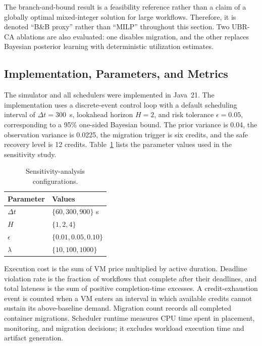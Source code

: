 The branch-and-bound result is a feasibility reference rather than a
claim of a globally optimal mixed-integer solution for large
workflows. Therefore, it is denoted ``B\&B proxy'' rather than
``MILP'' throughout this section. Two UBR-CA ablations are also
evaluated: one disables migration, and the other replaces Bayesian
posterior learning with deterministic utilization estimates.

\subsection{Implementation, Parameters, and Metrics}
\label{subsec:implementation}

The simulator and all schedulers were implemented in Java~21. The
implementation uses a discrete-event control loop with a default
scheduling interval of $\Delta t=300$~s, lookahead horizon $H=2$, and
risk tolerance $\epsilon=0.05$, corresponding to a 95\% one-sided
Bayesian bound. The prior variance is 0.04, the observation variance is
0.0225, the migration trigger is six credits, and the safe recovery
level is 12 credits. Table~\ref{tab:sensitivity-config} lists the
parameter values used in the sensitivity study.

\begin{table}[t]
\centering
\caption{Sensitivity-analysis configurations.}
\label{tab:sensitivity-config}
\begin{tabular}{ll}
\toprule
Parameter & Values \\
\midrule
$\Delta t$ & $\{60,300,900\}$ s \\
$H$ & $\{1,2,4\}$ \\
$\epsilon$ & $\{0.01,0.05,0.10\}$ \\
$\lambda$ & $\{10,100,1000\}$ \\
\bottomrule
\end{tabular}
\end{table}

Execution cost is the sum of VM price multiplied by active duration.
Deadline violation rate is the fraction of workflows that complete
after their deadlines, and total lateness is the sum of positive
completion-time excesses. A credit-exhaustion event is counted when a
VM enters an interval in which available credits cannot sustain its
above-baseline demand. Migration count records all completed
container migrations. Scheduler runtime measures CPU time spent in
placement, monitoring, and migration decisions; it excludes workload
execution time and artifact generation.

